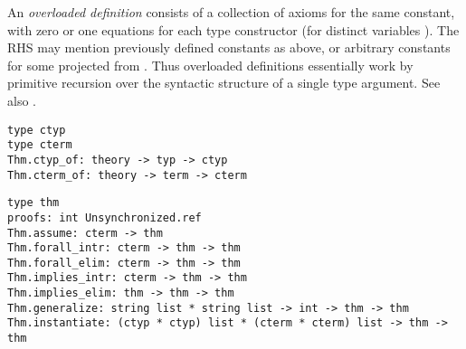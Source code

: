 \begin{isabellebody}
\begin{isamarkuptext}
  An \emph{overloaded definition} consists of a collection of axioms
  for the same constant, with zero or one equations  for each type constructor \isa{{\isasymkappa}} (for
  distinct variables \isa{\isactrlvec {\isasymalpha}}).  The RHS may mention
  previously defined constants as above, or arbitrary constants  for some  projected from \isa{\isactrlvec {\isasymalpha}}.  Thus overloaded definitions essentially work by
  primitive recursion over the syntactic structure of a single type
  argument.  See also \cite[\S4.3]{Haftmann-Wenzel:2006:classes}.%
\end{isamarkuptext}%
\isamarkuptrue%
%
\isadelimmlref
%
\endisadelimmlref
%
\isatagmlref
%
\begin{isamarkuptext}%
\begin{mldecls}
  \verb|type ctyp| \\
  \verb|type cterm| \\
  \verb|Thm.ctyp_of: theory -> typ -> ctyp| \\
  \verb|Thm.cterm_of: theory -> term -> cterm| \\
  \end{mldecls}
  \begin{mldecls}
  \verb|type thm| \\
  \verb|proofs: int Unsynchronized.ref| \\
  \verb|Thm.assume: cterm -> thm| \\
  \verb|Thm.forall_intr: cterm -> thm -> thm| \\
  \verb|Thm.forall_elim: cterm -> thm -> thm| \\
  \verb|Thm.implies_intr: cterm -> thm -> thm| \\
  \verb|Thm.implies_elim: thm -> thm -> thm| \\
  \verb|Thm.generalize: string list * string list -> int -> thm -> thm| \\
  \verb|Thm.instantiate: (ctyp * ctyp) list * (cterm * cterm) list -> thm -> thm| \\

\end{mldecls}
\end{isamarkuptext}
\end{isabellebody}
